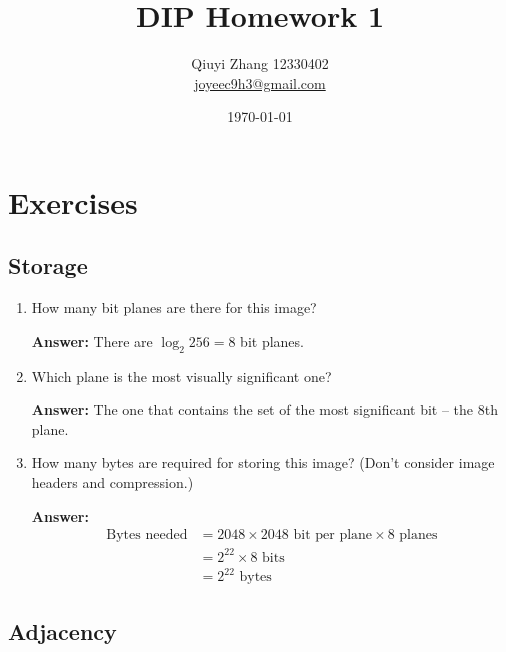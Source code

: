 \documentclass{article}
\begin{document}
\title{DIP Homework 1}
\author{Qiuyi Zhang 12330402 \\ \href{mailto:joyeec9h3@gmail.com}{joyeec9h3@gmail.com}} 
\date{\today}
\maketitle

\section{Exercises}

\subsection{Storage}
\begin{enumerate}
\item How many bit planes are there for this image?

\textbf{Answer:} There are $\log_{2} 256 = 8$ bit planes.

\item Which plane is the most visually significant one?

\textbf{Answer:} The one that contains the set of the most significant bit -- the 8th plane.

\item How many bytes are required for storing this image? (Don’t consider image headers and compression.)

\textbf{Answer:} 
\begin{align*} 
\textrm{Bytes needed} & = 2048 \times 2048\textrm{ bit per plane} \times 8\textrm{ planes} \\
 & = 2^{22} \times 8\textrm{ bits} \\
 & = 2^{22}\textrm{ bytes}
\end{align*}
\end{enumerate}

\subsection{Adjacency}
\end{document}
